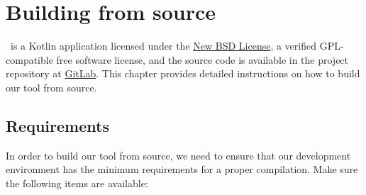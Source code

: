 \chapter{Building from source}
\label{chap:buildingfromsource}

\arara\ is a Kotlin application licensed under the \href{http://www.opensource.org/licenses/bsd-license.php}{New BSD License}, a verified GPL-compatible free software license, and the source code is available in the project repository at \href{https://gitlab.com/islandoftex/arara}{GitLab}. This chapter provides detailed instructions on how to build our tool from source.

\section{Requirements}
\label{sec:requirements}

In order to build our tool from source, we need to ensure that our development environment has the minimum requirements for a proper compilation. Make sure the following items are available:

